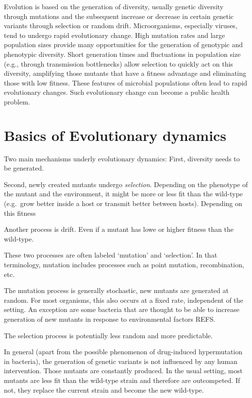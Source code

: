 \documentclass[]{book}
\theoremstyle{definition}
\theoremstyle{definition}
\theoremstyle{definition}
\theoremstyle{remark}
\begin{document}
Evolution is based on the generation of diversity, usually genetic
diversity through mutations and the subsequent increase or decrease in
certain genetic variants through selection or random drift.
Microorganisms, especially viruses, tend to undergo rapid evolutionary
change. High mutation rates and large population sizes provide many
opportunities for the generation of genotypic and phenotypic diversity.
Short generation times and fluctuations in population size (e.g.,
through transmission bottlenecks) allow selection to quickly act on this
diversity, amplifying those mutants that have a fitness advantage and
eliminating those with low fitness. These features of microbial
populations often lead to rapid evolutionary changes. Such evolutionary
change can become a public health problem.

\hypertarget{basics-of-evolutionary-dynamics}{%
\section{Basics of Evolutionary
dynamics}\label{basics-of-evolutionary-dynamics}}

Two main mechanisms underly evolutionary dynamics: First, diversity
needs to be generated.

Second, newly created mutants undergo \emph{selection}. Depending on the
phenotype of the mutant and the environment, it might be more or less
fit than the wild-type (e.g.~grow better inside a host or transmit
better between hosts). Depending on this fitness

Another process is drift. Even if a mutant has lowe or higher fitness
than the wild-type.

These two processes are often labeled `mutation' and `selection'. In
that terminology, mutation includes processes such as point mutation,
recombination, etc.

The mutation process is generally stochastic, new mutants are generated
at random. For most organisms, this also occurs at a fixed rate,
independent of the setting. An exception are some bacteria that are
thought to be able to increase generation of new mutants in response to
environmental factors REFS.

The selection process is potentially less random and more predictable.

In general (apart from the possible phenomenon of drug-induced
hypermutation in bacteria), the generation of genetic variants is not
influenced by any human intervention. Those mutants are constantly
produced. In the usual setting, most mutants are less fit than the
wild-type strain and therefore are outcompeted. If not, they replace the
current strain and become the new wild-type.
\end{document}
